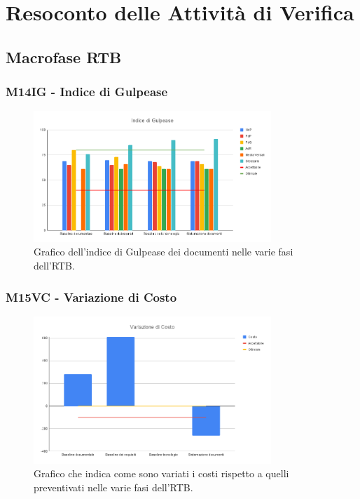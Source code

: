 \section{Resoconto delle Attività di Verifica}
\subsection{Macrofase RTB}
\subsubsection{M14IG - Indice di Gulpease}
\begin{figure}[H]
    \centering\includegraphics[width=0.8\textwidth, height=0.8\textheight,keepaspectratio]{images/RTB-Indice-di-Gulpease.png}
    \caption{Grafico dell'indice di Gulpease dei documenti nelle varie fasi dell'RTB.}
\end{figure}    

\subsubsection{M15VC - Variazione di Costo}
\begin{figure}[H]
    \centering\includegraphics[width=0.8\textwidth, height=0.8\textheight,keepaspectratio]{images/RTB-Variazione-di-Costo.png}
    \caption{Grafico che indica come sono variati i costi rispetto a quelli preventivati nelle varie fasi dell'RTB.}
\end{figure}    

